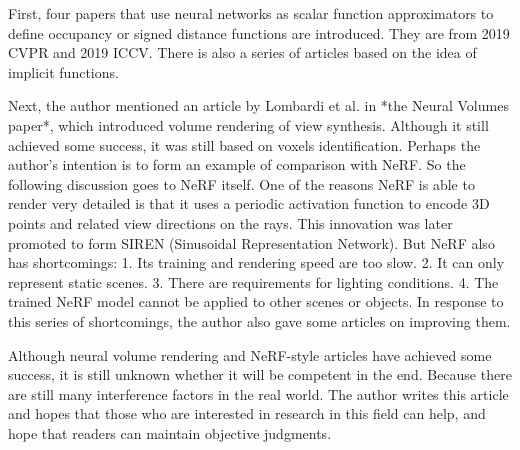 \documentclass[UTF-8]{ctexart}
\begin{document}
First, four papers that use neural networks as scalar function approximators to define occupancy or signed distance functions are introduced. They are from 2019 CVPR and 2019 ICCV. There is also a series of articles based on the idea of implicit functions.\par

Next, the author mentioned an article by Lombardi et al. in *the Neural Volumes paper*, which introduced volume rendering of view synthesis. Although it still achieved some success, it was still based on voxels identification. Perhaps the author's intention is to form an example of comparison with NeRF. So the following discussion goes to NeRF itself. One of the reasons NeRF is able to render very detailed is that it uses a periodic activation function to encode 3D points and related view directions on the rays. This innovation was later promoted to form SIREN (Sinusoidal Representation Network). But NeRF also has shortcomings: 1. Its training and rendering speed are too slow. 2. It can only represent static scenes. 3. There are requirements for lighting conditions. 4. The trained NeRF model cannot be applied to other scenes or objects. In response to this series of shortcomings, the author also gave some articles on improving them.\par

Although neural volume rendering and NeRF-style articles have achieved some success, it is still unknown whether it will be competent in the end. Because there are still many interference factors in the real world. The author writes this article and hopes that those who are interested in research in this field can help, and hope that readers can maintain objective judgments. 
\end{document}
